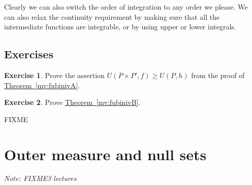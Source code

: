 \documentclass[12pt]{book}
\newcommand{\R}{{\mathbb{R}}}
\newcommand{\Q}{{\mathbb{Q}}}
\newcommand{\myindex}[1]{#1\index{#1}}
\newcommand{\sectionnotes}[1]{\noindent \emph{Note: #1} \medskip \par}
\newcommand{\sectionnewpage}{\clearpage}
\theoremstyle{plain}
\theoremstyle{remark}
\theoremstyle{definition}
\newtheorem{defn}[thm]{Definition}
\theoremstyle{exercise}
\newtheorem{exercise}{Exercise}[section]
\theoremstyle{example}
\newtheorem{example}[thm]{Example}
\newcommand{\thmref}[1]{\hyperref[#1]{Theorem~\ref*{#1}}}
\begin{document}
Clearly we can also switch the order of integration to any order we please.
We can also relax the continuity requirement by making sure that all the
intermediate functions are integrable, or by using upper or lower integrals.

\subsection{Exercises}

\begin{exercise}
Prove the assertion
$U(P \times P',f) \geq U(P,h)$ from the proof
of \thmref{mv:fubinivA}.
\end{exercise}

\begin{exercise}
Prove \thmref{mv:fubinivB}.
\end{exercise}

FIXME


\sectionnewpage
\section{Outer measure and null sets}
\label{sec:outermeasure}

\sectionnotes{FIXME3 lectures}

%
%
%
%
%
%
%
%
\end{document}
